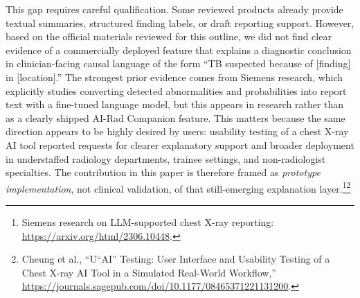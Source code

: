 \documentclass[11pt]{article}
\begin{document}
This gap requires careful qualification. Some reviewed products already provide textual summaries, structured finding labels, or draft reporting support. However, based on the official materials reviewed for this outline, we did not find clear evidence of a commercially deployed feature that explains a diagnostic conclusion in clinician-facing causal language of the form ``TB suspected because of [finding] in [location].'' The strongest prior evidence comes from Siemens research, which explicitly studies converting detected abnormalities and probabilities into report text with a fine-tuned language model, but this appears in research rather than as a clearly shipped AI-Rad Companion feature. This matters because the same direction appears to be highly desired by users: usability testing of a chest X-ray AI tool reported requests for clearer explanatory support and broader deployment in understaffed radiology departments, trainee settings, and non-radiologist specialties. The contribution in this paper is therefore framed as \emph{prototype implementation}, not clinical validation, of that still-emerging explanation layer.\footnote{Siemens research on LLM-supported chest X-ray reporting: \url{https://arxiv.org/html/2306.10448}.}\footnote{Cheung et al., ``U``AI'' Testing: User Interface and Usability Testing of a Chest X-ray AI Tool in a Simulated Real-World Workflow,'' \url{https://journals.sagepub.com/doi/10.1177/08465371221131200}.}
\end{document}

